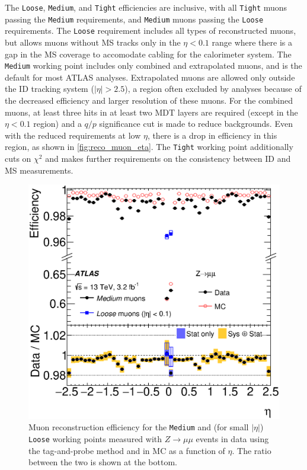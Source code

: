 The \texttt{Loose}, \texttt{Medium}, and \texttt{Tight} efficiencies are inclusive, with all \texttt{Tight} muons passing the \texttt{Medium} requirements, and \texttt{Medium} muons passing the \texttt{Loose} requirements. The \texttt{Loose} requirement includes all types of reconstructed muons, but allows muons without \ac{MS} tracks only in the $\eta<0.1$ range where there is a gap in the \ac{MS} coverage to accomodate cabling for the calorimeter system. The \texttt{Medium} working point includes only combined and extrapolated muons, and is the default for most \ac{ATLAS} analyses. Extrapolated muons are allowed only outside the \ac{ID} tracking system ($|\eta|>2.5$), a region often excluded by analyses because of the decreased efficiency and larger \pt resolution of these muons. For the combined muons, at least three hits in at least two \ac{MDT} layers are required (except in the $\eta<0.1$ region) and a $q/p$ significance cut is made to reduce backgrounds. Even with the reduced requirements at low $\eta$, there is a drop in efficiency in this region, as shown in \autoref{fig:reco_muon_eta}. The \texttt{Tight} working point additionally cuts on $\chi^2$ and makes further requirements on the consistency between \ac{ID} and \ac{MS} \pt measurements. 

\begin{centering}
\begin{figure}[!hbt]
\myfloatalign
\includegraphics[width=.9\linewidth]{figures/reco/fig_03a.eps}
\caption{Muon reconstruction efficiency for the \texttt{Medium} and (for small $|\eta|$) \texttt{Loose} working points measured with $Z\rightarrow\mu\mu$ events in data using the tag-and-probe method and in \ac{MC} as a function of $\eta$. The ratio between the two is shown at the bottom. \cite{1603.05598} }
\label{fig:reco_muon_eta}
\end{figure}
\end{centering}

